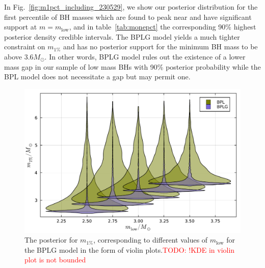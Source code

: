 \documentclass[modern]{aastex631}
\newcommand{\todo}[1]{\textcolor{red}{TODO: #1}}
\begin{document}
In Fig.~\ref{fig:m1pct_including_230529}, we show our posterior distribution for the first percentile of BH masses which are found to peak near and have significant support at $m=m_\mathrm{low}$, and in table~\ref{tab:monepct} the corresponding 90\% highest posterior density credible intervals. The BPLG model yields a much tighter constraint on $m_{1\%}$ and has no posterior support for the minimum BH mass to be above $3.6M_{\odot}$. In other words, BPLG model rules out the existence of a lower mass gap in our sample of low mass BHs with 90\% posterior probability while the BPL model does not necessitate a gap but may permit one.



\begin{figure}
     \includegraphics[width=\columnwidth]{figures/violin_plot.pdf}
     \caption{\label{fig:m1pct_including_230529_varying} The posterior for $m_{1\%}$, corresponding to different values of $m_{\mathrm{low}}$ for the BPLG model in the form of violin plots.\todo{!KDE in violin plot is not bounded}}
 \end{figure}
\end{document}
